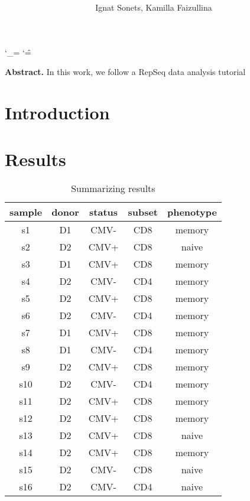 \documentclass{article}
\title{  }
\author{ Ignat Sonets, Kamilla Faizullina}
\date{\empty}
\begin{document}
 	
 	\catcode`\_=\active
 	\catcode`\^=\active
 	
 	\maketitle
 	
 	\textbf{Abstract.}  In this work, we follow a RepSeq data analysis tutorial 
 	
 	\section{Introduction}
 
 
 \section{Results}
 
   	\begin{table}[h!]
 	\centering
 	\begin{tabular}{|c|c|c|c|c|}
 		\hline
 	sample &	donor &	status &	subset&	phenotype \\ \hline
 	s1	& D1	&	CMV-		& CD8 &	memory \\ \hline
 	s2	&D2		&CMV+	&	CD8	& naive \\ \hline
 	s3	&D1		&CMV+	&	CD8	& memory\\ \hline
 	s4	&D2		&CMV-	&	CD4	& memory\\ \hline
 	s5	&D2		&CMV+	&	CD8	& memory\\ \hline
 	s6	&D2		&CMV-	&	CD4	& memory\\ \hline
 	s7	&D1		&CMV+	&	CD8	& memory\\ \hline
 	s8	&D1		&CMV-	&	CD4	& memory\\ \hline
 	s9	&D2		&CMV+	&	CD8	& memory\\ \hline
 	s10	&D2		&CMV-	&	CD4	& memory\\ \hline		
 	s11	&D2		&CMV+	&	CD8	& memory\\ \hline
 	s12	&D2		&CMV+	&	CD8 &	memory\\ \hline
 	s13	&D2		&CMV+	&	CD8	&naive\\ \hline
 	s14	&D2		&CMV+	&	CD8	&memory\\ \hline
 	s15	&D2		&CMV-	&	CD8	&naive\\ \hline
 	s16&	D2	&	CMV-	&	CD4	&naive\\ \hline
 		
 		\hline	 
 		
 	\end{tabular}
  	\caption{ Summarizing results  }
  \label{tab:var}
\end{table}



 	\begin{thebibliography}{9}
 		
 		
 		
 
 	\end{thebibliography}
 	
 	
 	
 	
 
\end{document}
